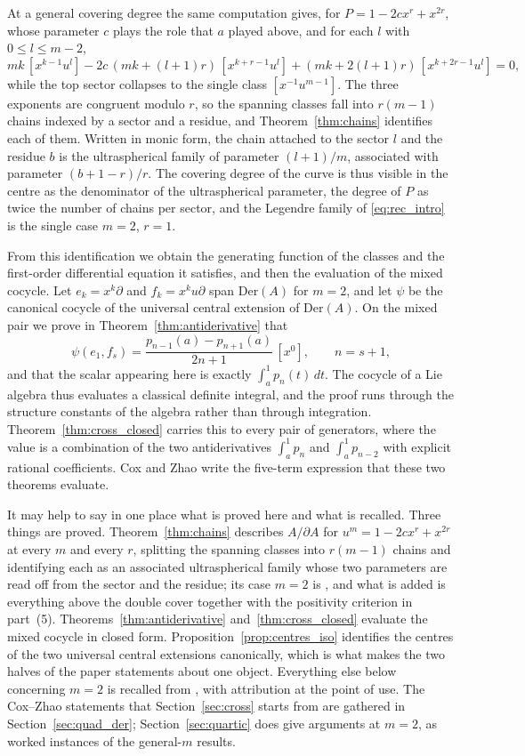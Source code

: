 \documentclass[11pt]{amsart}
\theoremstyle{definition}
\theoremstyle{remark}
\newcommand{\Der}{\mathrm{Der}}
\newcommand{\pa}{\partial}
\begin{document}
At a general covering degree the same computation gives, for
$P=1-2cx^r+x^{2r}$, whose parameter $c$ plays the role that $a$ played above,
and for each $l$ with $0\leq l\leq m-2$,
\begin{equation}\label{eq:rec_intro_general}
  mk\,[x^{k-1}u^{l}] - 2c\,(mk+(l+1)r)\,[x^{k+r-1}u^{l}]
    + (mk+2(l+1)r)\,[x^{k+2r-1}u^{l}] = 0 ,
\end{equation}
while the top sector collapses to the single class $[x^{-1}u^{m-1}]$. The three
exponents are congruent modulo $r$, so the spanning classes fall into
$r(m-1)$ chains indexed by a sector and a residue, and
Theorem~\ref{thm:chains} identifies each of them. Written in monic form, the
chain attached to the sector $l$ and the residue $b$ is the ultraspherical
family of parameter $(l+1)/m$, associated with parameter $(b+1-r)/r$. The
covering degree of the curve is thus visible in the centre as the denominator of
the ultraspherical parameter, the degree of $P$ as twice the number of chains
per sector, and the Legendre family of \eqref{eq:rec_intro} is the single case
$m=2$, $r=1$.

From this identification we obtain the generating function of the classes and
the first-order differential equation it satisfies, and then the evaluation of
the mixed cocycle. Let $e_k=x^k\partial$ and $f_k=x^ku\partial$ span
$\Der(A)$ for $m=2$, and let $\psi$ be the canonical cocycle of the universal
central extension of $\Der(A)$. On the mixed pair we prove in
Theorem~\ref{thm:antiderivative} that
\[
  \psi(e_1,f_s) = \frac{p_{n-1}(a)-p_{n+1}(a)}{2n+1}\,[x^0],
  \qquad n=s+1,
\]
and that the scalar appearing here is exactly $\int_a^1p_n(t)\,dt$. The cocycle
of a Lie algebra thus evaluates a classical definite integral, and the proof
runs through the structure constants of the algebra rather than through
integration. Theorem~\ref{thm:cross_closed} carries this to every pair of
generators, where the value is a combination of the two antiderivatives
$\int_a^1p_n$ and $\int_a^1p_{n-2}$ with explicit rational coefficients. Cox and
Zhao write the five-term expression that these two theorems evaluate.

It may help to say in one place what is proved here and what is recalled. Three
things are proved. Theorem~\ref{thm:chains} describes $A/\pa A$ for
$u^m=1-2cx^r+x^{2r}$ at every $m$ and every $r$, splitting the spanning classes
into $r(m-1)$ chains and identifying each as an associated ultraspherical family
whose two parameters are read off from the sector and the residue; its case
$m=2$ is \cite[\S2.4]{CoxZhao2018}, and what is added is everything above the
double cover together with the positivity criterion in part~(5).
Theorems~\ref{thm:antiderivative} and~\ref{thm:cross_closed} evaluate the mixed
cocycle in closed form. Proposition~\ref{prop:centres_iso} identifies the centres
of the two universal central extensions canonically, which is what makes the two
halves of the paper statements about one object. Everything else below concerning
$m=2$ is recalled from \cite{CoxZhao2018}, with attribution at the point of
use. The Cox--Zhao statements that Section~\ref{sec:cross} starts from are
gathered in Section~\ref{sec:quad_der};
Section~\ref{sec:quartic} does give arguments at $m=2$, as worked instances of
the general-$m$ results.
\end{document}
